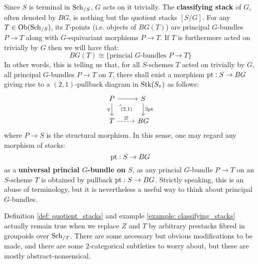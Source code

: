            \begin{example} \label{example: classifying_stacks}
                Since $S$ is terminal in $\mathrm{Sch}_{/S}$, $G$ acts on it trivially. The \textbf{classifying stack} of $G$, often denoted by $BG$, is nothing but the quotient stacks $[S/G]$. For any $T \in \mathrm{Ob}(\mathrm{Sch}_{/S})$, its $T$-points (i.e. objects of $BG(T)$) are principal $G$-bundles $P \to T$ along with $G$-equivariant morphisms $P \to T$. If $T$ is furthermore acted on trivially by $G$ then we will have that:
                    $$BG(T) \cong \{ \text{princial $G$-bundles $P \to T$} \}$$
                In other words, this is telling us that, for all $S$-schemes $T$ acted on trivially by $G$, all principal $G$-bundles $P \to T$ on $T$, there shall exist a morphism $\mathrm{pt}: S \to BG$ giving rise to a $(2, 1)$-pullback diagram in $\mathrm{Stk}(S_{\tau})$ as follows:
                    $$
                        \begin{tikzcd}
                    	P & S \\
                    	T & BG
                    	\arrow[from=1-1, to=1-2]
                    	\arrow["\forall"', from=1-1, to=2-1]
                    	\arrow["{(2, 1)}"{description}, "\lrcorner"{anchor=center, pos=0.125}, draw=none, from=1-1, to=2-2]
                    	\arrow["\exists \pt", from=1-2, to=2-2]
                    	\arrow["{\exists!}", dashed, from=2-1, to=2-2]
                        \end{tikzcd}
                    $$
                where $P \to S$ is the structural morphism. In this sense, one may regard any morphism of stacks:
                    $$\mathrm{pt}: S \to BG$$
                as a \textbf{universal princial $G$-bundle on $S$}, as any princial $G$-bundle $P \to T$ on an $S$-scheme $T$ is obtained by pullback $\mathrm{pt}: S \to BG$. Strictly speaking, this is an abuse of terminology, but it is nevertheless a useful way to think about principal $G$-bundles.
            \end{example}
            \begin{remark}
                 Definition \ref{def: quotient_stacks} and example \ref{example: classifying_stacks} actually remain true when we replace $Z$ and $T$ by arbitrary prestacks fibred in groupoids over $\mathrm{Sch}_{/T}$. There are some necessary but obvious modifications to be made, and there are some $2$-categorical subtleties to worry about, but these are mostly abstract-nonsensical.
            \end{remark}
    
